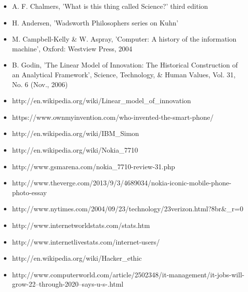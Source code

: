 \documentclass[paper=a4, fontsize=12pt]{scrartcl} %
\numberwithin{equation}{section} %
\numberwithin{figure}{section} %
\numberwithin{table}{section} %
\begin{document}
	\begin{itemize}
		\item A. F. Chalmers, 'What is this thing called Science?' third edition
		\item H. Andersen, 'Wadsworth Philosophers series on Kuhn'
		\item M. Campbell-Kelly \& W. Aspray, 'Computer: A history of the information machine', Oxford: Westview Press, 2004
		\item B. Godin, 'The Linear Model of Innovation: The Historical Construction of an Analytical Framework', Science, Technology, \& Human Values, Vol. 31, No. 6 (Nov., 2006)
		\item http://en.wikipedia.org/wiki/Linear\_model\_of\_innovation
		\item https://www.ownmyinvention.com/who-invented-the-smart-phone/
		\item http://en.wikipedia.org/wiki/IBM\_Simon
		\item http://en.wikipedia.org/wiki/Nokia\_7710
		\item http://www.gsmarena.com/nokia\_7710-review-31.php
		\item http://www.theverge.com/2013/9/3/4689034/nokia-iconic-mobile-phone-photo-essay
		\item http://www.nytimes.com/2004/09/23/technology/23verizon.html?8br\&\_r=0
		\item http://www.internetworldstats.com/stats.htm
		\item http://www.internetlivestats.com/internet-users/
		\item http://en.wikipedia.org/wiki/Hacker\_ethic
		\item http://www.computerworld.com/article/2502348/it-management/it-jobs-will-grow-22--through-2020--says-u-s-.html
	\end{itemize}
	
	\newpage
	
\end{document}
